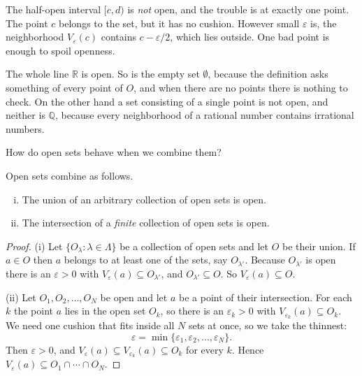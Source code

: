 \begin{example}
The half-open interval $[c,d)$ is \emph{not} open, and the trouble is at exactly one point.  The point $c$ belongs to the set, but it has no cushion.  However small $\varepsilon$ is, the neighborhood $V_{\varepsilon}(c)$ contains $c - \varepsilon/2$, which lies outside.  One bad point is enough to spoil openness.
\end{example}

\begin{example}
The whole line $\mathbb{R}$ is open.  So is the empty set $\emptyset$, because the definition asks something of every point of $O$, and when there are no points there is nothing to check.  On the other hand a set consisting of a single point is not open, and neither is $\mathbb{Q}$, because every neighborhood of a rational number contains irrational numbers.
\end{example}

How do open sets behave when we combine them?

\begin{theorem}\label{thm:open-unions}
Open sets combine as follows.
\begin{enumerate}[(i)]
	\item The union of an arbitrary collection of open sets is open.
	\item The intersection of a \emph{finite} collection of open sets is open.
\end{enumerate}
\end{theorem}

\begin{proof}
(i)  Let $\{O_{\lambda} : \lambda \in \Lambda\}$ be a collection of open sets and let $O$ be their union.  If $a \in O$ then $a$ belongs to at least one of the sets, say $O_{\lambda'}$.  Because $O_{\lambda'}$ is open there is an $\varepsilon > 0$ with $V_{\varepsilon}(a) \subseteq O_{\lambda'}$, and $O_{\lambda'} \subseteq O$.  So $V_{\varepsilon}(a) \subseteq O$.

(ii)  Let $O_1, O_2, \ldots, O_N$ be open and let $a$ be a point of their intersection.  For each $k$ the point $a$ lies in the open set $O_k$, so there is an $\varepsilon_k > 0$ with $V_{\varepsilon_k}(a) \subseteq O_k$.  We need one cushion that fits inside all $N$ sets at once, so we take the thinnest:
\[ \varepsilon = \min\{\varepsilon_1, \varepsilon_2, \ldots, \varepsilon_N\}. \]
Then $\varepsilon > 0$, and $V_{\varepsilon}(a) \subseteq V_{\varepsilon_k}(a) \subseteq O_k$ for every $k$.  Hence $V_{\varepsilon}(a) \subseteq O_1 \cap \cdots \cap O_N$.
\end{proof}

